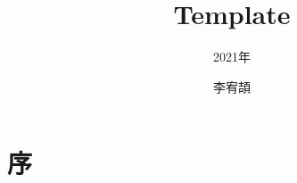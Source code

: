 \documentclass[cn,10pt,math=newtx,chinesefont=founder]{elegantbook}
\title{Template}
\subtitle{2021年}
\author{李宥頡}
\institute{National Taiwan University}
\begin{document}
\maketitle
\frontmatter

\chapter*{序}
\tableofcontents

\mainmatter
\end{document}
